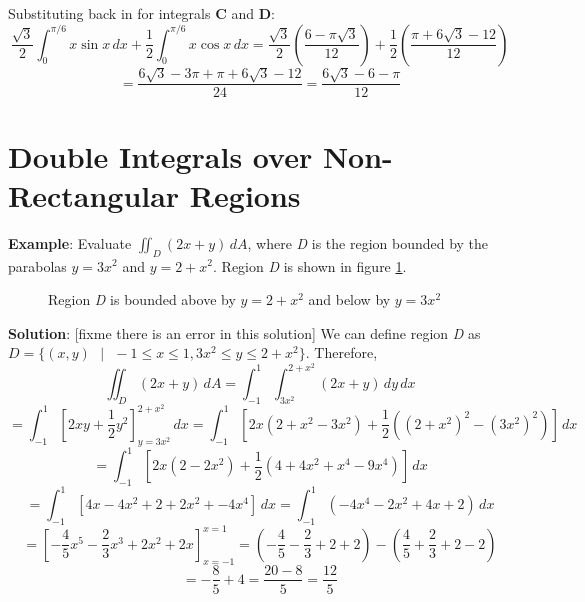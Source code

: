 \begin{Answer}[ref = fubini_2]
\begin{enumerate}
Substituting back in for integrals \textbf{C} and \textbf{D}:
$$\frac{\sqrt{3}}{2} \int_0^{\pi/6} x \sin{x}\,dx + \frac{1}{2} \int_0^{\pi/6} 
x \cos{x}\,dx = \frac{\sqrt{3}}{2} \left( \frac{6 - \pi \sqrt{3}}{12} \right) 
+ \frac{1}{2} \left( \frac{\pi + 6\sqrt{3}- 12}{12} \right)$$
$$= \frac{6 \sqrt{3} - 3\pi + \pi + 6\sqrt{3} - 12}{24} = \frac{6 \sqrt{3} - 6 
- \pi}{12}$$
\end{enumerate}
\end{Answer}

\section{Double Integrals over Non-Rectangular Regions}

\textbf{Example}: Evaluate $\iint_{\textit{D}} (2x + y)\,dA$, where \textit{D} is the region bounded by the parabolas $y = 3x^2$ and $y = 2 + x^2$. Region \textit{D} is shown in figure \ref{fig:parabola}. 

\begin{figure}[htbp]
\centering
    \caption{Region \textit{D} is bounded above by $y = 2 + x^2$ and below by $y = 3x^2$}
    \label{fig:parabola}
\end{figure}

\textbf{Solution}: [fixme there is an error in this solution] We can define region \textit{D} as $\textit{D} = \{(x, y)\text{ }|\text{ } -1 \leq x \leq 1, 3x^2 \leq y \leq 2 + x^2 \}$. Therefore, 
$$\iint_{\textit{D}} (2x + y)\,dA = \int_{-1}^1 \int_{3x^2}^{2 + x^2} \left(2x + y \right)\,dy\,dx$$
$$= \int_{-1}^1 \left[2xy + \frac{1}{2}y^2 \right]_{y = 3x^2}^{2 + x^2}\,dx = \int_{-1}^1 \left[ 2x \left( 2 + x^2 - 3x^2 \right) + \frac{1}{2} \left( (2 + x^2)^2 - (3x^2)^2 \right) \right]\,dx$$
$$= \int_{-1}^1 \left[ 2x(2 - 2x^2) + \frac{1}{2} (4 + 4x^2 + x^4 - 9x^4) \right]\,dx$$
$$= \int_{-1}^1 \left[ 4x - 4x^2 + 2 + 2x^2 + -4x^4 \right]\,dx = \int_{-1}^1 \left( -4x^4 - 2x^2 + 4x + 2 \right)\,dx$$
$$=  \left[-\frac{4}{5}x^5 - \frac{2}{3}x^3 + 2x^2 + 2x \right]_{x = -1}^{x = 1} = \left( -\frac{4}{5} - \frac{2}{3} + 2 + 2 \right) - \left( \frac{4}{5} + \frac{2}{3} + 2 - 2 \right)$$
$$= -\frac{8}{5} + 4 = \frac{20 - 8}{5} = \frac{12}{5}$$


